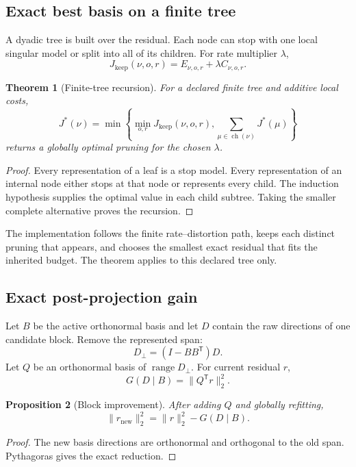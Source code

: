 \documentclass[11pt]{article}
\newtheorem{theorem}{Theorem}[section]
\newtheorem{proposition}[theorem]{Proposition}
\theoremstyle{definition}
\theoremstyle{remark}
\begin{document}
\FloatBarrier
\subsection{Exact best basis on a finite tree}
A dyadic tree is built over the residual. Each node can stop with one local singular model or split into all of its children. For rate multiplier $\lambda$,
\[
J_{\mathrm{keep}}(\nu,o,r)=E_{\nu,o,r}+\lambda C_{\nu,o,r}.
\]

\begin{theorem}[Finite-tree recursion]
For a declared finite tree and additive local costs,
\[
J^*(\nu)=\min\left\{
\min_{o,r}J_{\mathrm{keep}}(\nu,o,r),
\sum_{\mu\in\operatorname{ch}(\nu)}J^*(\mu)
\right\}
\]
returns a globally optimal pruning for the chosen $\lambda$.
\end{theorem}

\begin{proof}
Every representation of a leaf is a stop model. Every representation of an internal node either stops at that node or represents every child. The induction hypothesis supplies the optimal value in each child subtree. Taking the smaller complete alternative proves the recursion.
\end{proof}

The implementation follows the finite rate--distortion path, keeps each distinct pruning that appears, and chooses the smallest exact residual that fits the inherited budget. The theorem applies to this declared tree only.

\FloatBarrier
\subsection{Exact post-projection gain}
Let $B$ be the active orthonormal basis and let $D$ contain the raw directions of one candidate block. Remove the represented span:
\[
D_\perp=(I-BB^{\mathsf T})D.
\]
Let $Q$ be an orthonormal basis of $\operatorname{range}D_\perp$. For current residual $r$,
\[
\boxed{G(D\mid B)=\|Q^{\mathsf T}r\|_2^2.}
\]

\begin{proposition}[Block improvement]
After adding $Q$ and globally refitting,
\[
\|r_{\mathrm{new}}\|_2^2=\|r\|_2^2-G(D\mid B).
\]
\end{proposition}

\begin{proof}
The new basis directions are orthonormal and orthogonal to the old span. Pythagoras gives the exact reduction.
\end{proof}
\end{document}
